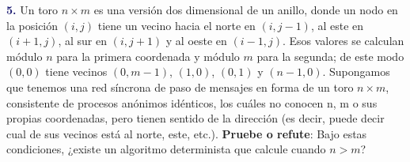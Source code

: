 \newpage
\textbf{\textcolor{MidnightBlue}{5.}} Un toro $n \times m$ es una versión dos dimensional de un anillo, donde un nodo en la posición $(i, j)$ tiene un vecino hacia el norte en $(i, j- 1)$, al este en $(i + 1, j)$, al sur en $(i, j + 1)$ y
al oeste en $(i − 1, j)$. Esos valores se calculan módulo $n$ para la primera coordenada y módulo $m$ para la segunda; de este modo $(0, 0)$ tiene vecinos $(0, m − 1)$, $(1, 0)$, $(0, 1)$ y $(n − 1, 0)$.
Supongamos que tenemos una red síncrona de paso de mensajes en forma de un toro $n \times m$, consistente de procesos anónimos idénticos, los cuáles no conocen n, m o sus propias coordenadas, pero tienen sentido de la dirección (es decir, puede decir cual de sus vecinos está al norte, este, etc.).
\textbf{Pruebe o refute}: Bajo estas condiciones, ¿existe un algoritmo determinista que calcule cuando
$n > m$?